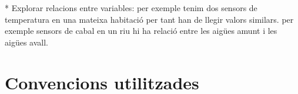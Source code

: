 * Explorar relacions entre variables: per exemple tenim dos sensors de temperatura en una mateixa habitació per tant han de llegir valors similars. per exemple sensors de cabal en un riu hi ha relació entre les aigües amunt i les aigües avall.





\section{Convencions utilitzades}















